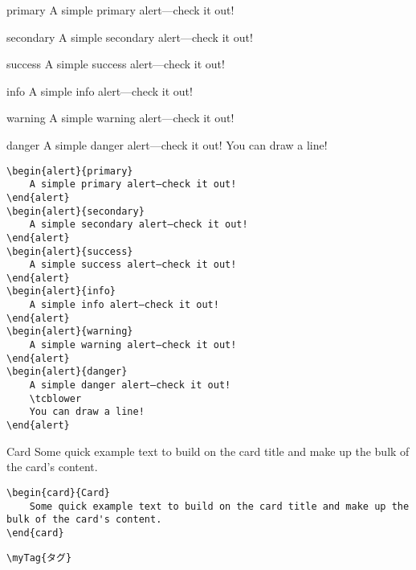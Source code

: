\documentclass[xelatex,ja=standard,b5j,8pt,magstyle=nomag*,japaram={units}]{bxjsarticle}
\begin{document}
\newpage
\begin{multicols}{2}
\begin{alert}{primary}
A simple primary alert—check it out!
\end{alert}
\begin{alert}{secondary}
A simple secondary alert—check it out!
\end{alert}
\begin{alert}{success}
A simple success alert—check it out!
\end{alert}
\begin{alert}{info}
A simple info alert—check it out!
\end{alert}
\begin{alert}{warning}
A simple warning alert—check it out!
\end{alert}
\begin{alert}{danger}
A simple danger alert—check it out!
\tcblower
You can draw a line!
\end{alert}
\columnbreak
\begin{lstlisting}
\begin{alert}{primary}
    A simple primary alert—check it out!
\end{alert}
\begin{alert}{secondary}
    A simple secondary alert—check it out!
\end{alert}
\begin{alert}{success}
    A simple success alert—check it out!
\end{alert}
\begin{alert}{info}
    A simple info alert—check it out!
\end{alert}
\begin{alert}{warning}
    A simple warning alert—check it out!
\end{alert}
\begin{alert}{danger}
    A simple danger alert—check it out!
    \tcblower
    You can draw a line!
\end{alert}
\end{lstlisting}
\end{multicols}



\begin{multicols}{2}
\begin{card}{Card}
Some quick example text to build on the card title and make up the bulk of the card's content.
\end{card}
\columnbreak
\begin{lstlisting}
\begin{card}{Card}
    Some quick example text to build on the card title and make up the bulk of the card's content.
\end{card}
\end{lstlisting}
\end{multicols}

\begin{multicols}{2}
\columnbreak
\begin{lstlisting}
\myTag{タグ}
\end{lstlisting}
\end{multicols}
\end{document}
